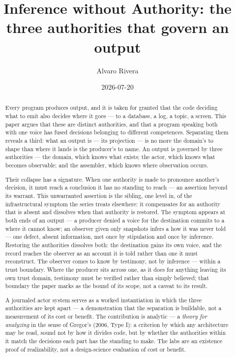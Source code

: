 \documentclass[
]{article}
\title{Inference without Authority: the three authorities that govern an
output}
\author{Alvaro Rivera}
\date{2026-07-20}
\begin{document}
\maketitle
\begin{abstract}
Every program produces output, and it is taken for granted that the code
deciding what to emit also decides where it goes --- to a database, a
log, a topic, a screen. This paper argues that these are distinct
authorities, and that a program speaking both with one voice has fused
decisions belonging to different competences. Separating them reveals a
third: what an output is --- its projection --- is no more the domain's
to shape than where it lands is the producer's to name. An output is
governed by three authorities --- the domain, which knows what exists;
the actor, which knows what becomes observable; and the assembler, which
knows where observation occurs.

Their collapse has a signature. When one authority is made to pronounce
another's decision, it must reach a conclusion it has no standing to
reach --- an assertion beyond its warrant. This unwarranted assertion is
the sibling, one level in, of the infrastructural symptom the series
treats elsewhere: it compensates for an authority that is absent and
dissolves when that authority is restored. The symptom appears at both
ends of an output --- a producer denied a voice for the destination
commits to a where it cannot know; an observer given only snapshots
infers a how it was never told --- one defect, absent information, met
once by stipulation and once by inference. Restoring the authorities
dissolves both: the destination gains its own voice, and the record
reaches the observer as an account it is told rather than one it must
reconstruct. The observer comes to know by testimony, not by inference
--- within a trust boundary. Where the producer sits across one, as it
does for anything leaving its own trust domain, testimony must be
verified rather than simply believed; that boundary the paper marks as
the bound of its scope, not a caveat to its result.

A journaled actor system serves as a worked instantiation in which the
three authorities are kept apart --- a demonstration that the separation
is buildable, not a measurement of its cost or benefit. The contribution
is analytic --- a \emph{theory for analyzing} in the sense of Gregor's
(2006, Type I): a criterion by which any architecture may be read, sound
not by how it divides code, but by whether the authorities within it
match the decisions each part has the standing to make. The labs are an
existence proof of realizability, not a design-science evaluation of
cost or benefit.
\end{abstract}
\end{document}
